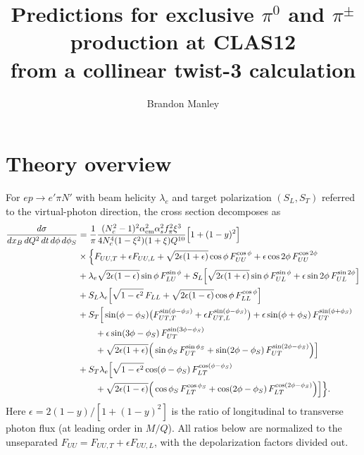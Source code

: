 \documentclass[aps,prd,showpacs,notitlepage,nofootinbib,preprintnumbers,amsmath,amssymb]{revtex4-2}
\begin{document}
\title{Predictions for exclusive $\pi^0$ and $\pi^\pm$ production at CLAS12\\[2pt]
from a collinear twist-3 calculation}
\author{Brandon Manley}
    
\maketitle

\tableofcontents

\section{Theory overview}
\label{sec:setup}

For $ep\to e'\pi N'$ with beam helicity $\lambda_e$ and target polarization $(S_L,S_T)$ referred to the virtual-photon direction, the cross section decomposes as~\cite{Bacchetta:2004jz, Diehl:2005pc}
\begin{align}
\frac{d\sigma}{dx_B\,dQ^2\,dt\,d\phi\,d\phi_S}&=
\frac{1}{\pi}\frac{(N_c^2-1)^2\alpha_{\rm em}^2\alpha_s^2f_\pi^2\xi^3}{4N_c^4(1-\xi^2)(1+\xi)Q^{10}} \Big[1+(1-y)^2 \Big]
\notag \\ 
&\times 
\Big\{F_{UU,T}+\epsilon F_{UU,L}+\sqrt{2\epsilon(1+\epsilon)}\cos\phi\,F_{UU}^{\cos\phi}+\epsilon\cos2\phi\,F_{UU}^{\cos2\phi}\nonumber\\
&+\lambda_e\sqrt{2\epsilon(1-\epsilon)}\sin\phi\,F_{LU}^{\sin\phi}+S_L\Big[\sqrt{2\epsilon(1+\epsilon)}\sin\phi\,F_{UL}^{\sin\phi}+\epsilon\sin2\phi\,F_{UL}^{\sin2\phi}\Big]\nonumber\\
&+S_L\lambda_e\Big[\sqrt{1-\epsilon^2}\,F_{LL}+\sqrt{2\epsilon(1-\epsilon)}\cos\phi\,F_{LL}^{\cos\phi}\Big]\nonumber\\
&+S_T\Big[\sin(\phi-\phi_S)\big(F_{UT,T}^{\sin(\phi-\phi_S)}+\epsilon F_{UT,L}^{\sin(\phi-\phi_S)}\big)+\epsilon\sin(\phi+\phi_S)\,F_{UT}^{\sin(\phi+\phi_S)}\nonumber\\
&\qquad+\epsilon\sin(3\phi-\phi_S)\,F_{UT}^{\sin(3\phi-\phi_S)}\nonumber\\
&\qquad+\sqrt{2\epsilon(1+\epsilon)}\Big(\sin\phi_S\,F_{UT}^{\sin\phi_S}+\sin(2\phi-\phi_S)\,F_{UT}^{\sin(2\phi-\phi_S)}\Big)\Big]\nonumber\\
&+S_T\lambda_e\Big[\sqrt{1-\epsilon^2}\cos(\phi-\phi_S)\,F_{LT}^{\cos(\phi-\phi_S)}\nonumber\\
&\qquad+\sqrt{2\epsilon(1-\epsilon)}\Big(\cos\phi_S\,F_{LT}^{\cos\phi_S}+\cos(2\phi-\phi_S)\,F_{LT}^{\cos(2\phi-\phi_S)}\Big)\Big]\Big\}.
\label{eq:xsec}
\end{align}
Here $\epsilon=2(1-y)/[1+(1-y)^2]$ is the ratio of longitudinal to transverse photon flux (at leading order in $M/Q$). All ratios below are normalized to the unseparated $F_{UU}=F_{UU,T}+\epsilon F_{UU,L}$, with the depolarization factors divided out.
\end{document}

